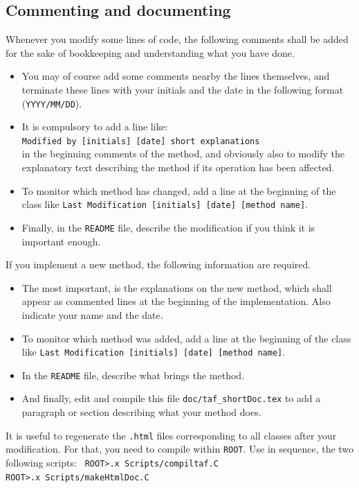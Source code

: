 \documentclass[a4paper, 12pt, twoside]{article}
\begin{document}
\subsection{Commenting and documenting}
\label{subsecCommenting}

Whenever you modify some lines of code, the following comments shall be added for the sake of bookkeeping and understanding what you have done.
\begin{itemize}
\item You may of course add some comments nearby the lines themselves, and terminate these lines with your initials and the date in the following format ({\tt YYYY/MM/DD}).
\item It is compulsory to add a line like:\\
{\tt Modified by [initials] [date] short explanations}\\
in the beginning comments of the method, and obviously also to modify the explanatory text describing the method if its operation has been affected.
\item To monitor which method has changed, add a line at the beginning of the class like {\tt Last Modification [initials] [date] [method name]}.
\item Finally, in the {\tt README} file, describe the modification if you think it is important enough.
\end{itemize}

\vspace{.8 cm}

\noindent
If you implement a new method, the following information are required.
\begin{itemize}
\item The most important, is the explanations on the new method, which shall appear as commented lines at the beginning of the implementation. Also indicate your name and the date.
\item To monitor which method was added, add a line at the beginning of the class like {\tt Last Modification [initials] [date] [method name]}.
\item In the {\tt README} file, describe what brings the method.
\item And finally, edit and compile this file {\tt doc/taf\_shortDoc.tex} to add a paragraph or section describing what your method does.
\end{itemize}

\vspace{.8 cm}

\noindent
It is useful to regenerate the {\tt .html} files corresponding to all classes after your modification. For that, you need to compile within {\tt ROOT}. Use in sequence, the two following scripts:
{\tt
ROOT>.x Scripts/compiltaf.C\\
ROOT>.x Scripts/makeHtmlDoc.C
}
\end{document}
